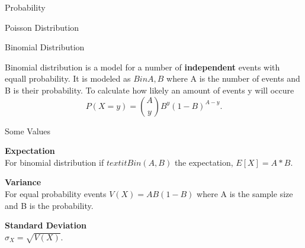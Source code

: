\documentclass[12pt, letterpaper]{article}
\begin{document}
\begin{section}{Probability}
\begin{subsection}{Poisson Distribution}
  \end{subsection}

  \begin{subsection}{Binomial Distribution}

    Binomial distribution is a model for a number of \textbf{independent} events
    with equall probability. It is modeled as \(\textit{Bin}{A, B}\) where A is
    the number of events and B is their probability. To calculate how likely an
    amount of events y will occure \[P(X = y) = \binom{A}{y} B^{y} (1 - B)^{A - y}.\]

  \end{subsection}

  \begin{subsection}{Some Values}

    \textbf{Expectation} \\
    For binomial distribution if \(textit{Bin}(A, B)\) the expectation,
    \(E[X] = A * B\).

    \textbf{Variance} \\
    For equal probability events \(V(X) = AB(1 - B)\)  where A is the sample
    size and B is the probability.

    \textbf{Standard Deviation} \\
    \(\sigma_{X} = \sqrt{V(X)}\).

  \end{subsection}

\end{section}
\end{document}
